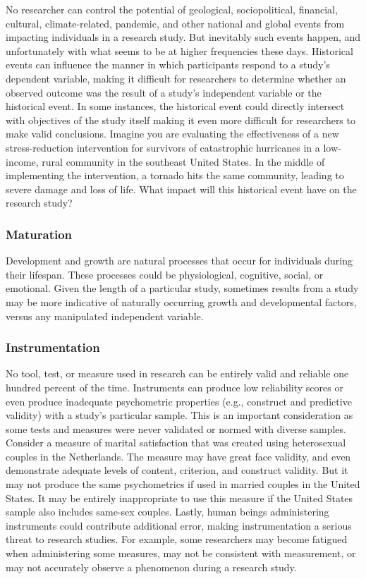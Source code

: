 \documentclass[
  11pt,
]{book}
\begin{document}
No researcher can control the potential of geological, sociopolitical, financial, cultural, climate-related, pandemic, and other national and global events from impacting individuals in a research study. But inevitably such events happen, and unfortunately with what seems to be at higher frequencies these days. Historical events can influence the manner in which participants respond to a study's dependent variable, making it difficult for researchers to determine whether an observed outcome was the result of a study's independent variable or the historical event. In some instances, the historical event could directly intersect with objectives of the study itself making it even more difficult for researchers to make valid conclusions. Imagine you are evaluating the effectiveness of a new stress-reduction intervention for survivors of catastrophic hurricanes in a low-income, rural community in the southeast United States. In the middle of implementing the intervention, a tornado hits the same community, leading to severe damage and loss of life. What impact will this historical event have on the research study?

\hypertarget{maturation}{%
\subsubsection{Maturation}\label{maturation}}

Development and growth are natural processes that occur for individuals during their lifespan. These processes could be physiological, cognitive, social, or emotional. Given the length of a particular study, sometimes results from a study may be more indicative of naturally occurring growth and developmental factors, versus any manipulated independent variable.

\hypertarget{instrumentation}{%
\subsubsection{Instrumentation}\label{instrumentation}}

No tool, test, or measure used in research can be entirely valid and reliable one hundred percent of the time. Instruments can produce low reliability scores or even produce inadequate psychometric properties (e.g., construct and predictive validity) with a study's particular sample. This is an important consideration as some tests and measures were never validated or normed with diverse samples. Consider a measure of marital satisfaction that was created using heterosexual couples in the Netherlands. The measure may have great face validity, and even demonstrate adequate levels of content, criterion, and construct validity. But it may not produce the same psychometrics if used in married couples in the United States. It may be entirely inappropriate to use this measure if the United States sample also includes same-sex couples. Lastly, human beings administering instruments could contribute additional error, making instrumentation a serious threat to research studies. For example, some researchers may become fatigued when administering some measures, may not be consistent with measurement, or may not accurately observe a phenomenon during a research study.
\end{document}
